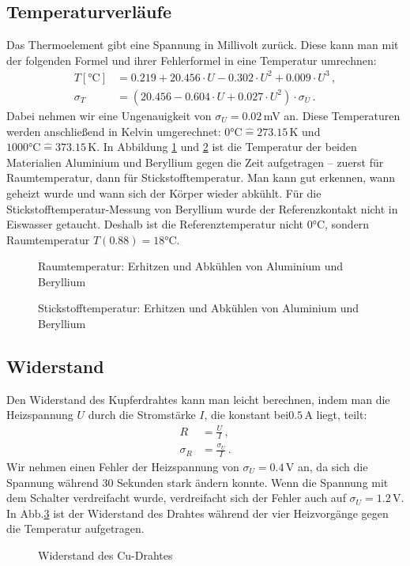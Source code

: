 \documentclass[12pt,a4paper,titlepage,headinclude,bibtotoc]{scrartcl}
\newcommand{\corresponds}{\ensuremath{\mathrel{\widehat{=}}}}
\begin{document}
\subsection{Temperaturverläufe}
Das Thermoelement gibt eine Spannung in Millivolt zurück.
Diese kann man mit der folgenden Formel und ihrer Fehlerformel in eine Temperatur umrechnen:
\begin{align}
	T[\si{\celsius}]&=0.219+20.456 \cdot U - 0.302\cdot U^2+0.009\cdot U^3 \,, \\
	\sigma_T&=(20.456 - 0.604\cdot U+0.027\cdot U^2)\cdot \sigma_U\,.
\end{align}
Dabei nehmen wir eine Ungenauigkeit von $\sigma_U=0.02\,$mV an.
Diese Temperaturen werden anschließend in Kelvin umgerechnet: $0\si\celsius\corresponds 273.15 \, \si\kelvin$ und $1000\si\celsius\corresponds 373.15 \, \si\kelvin$. 
In Abbildung \ref{fig:Raumtemp} und \ref{fig:Stickstofftemp} ist die Temperatur der beiden Materialien Aluminium und Beryllium gegen die Zeit aufgetragen -- zuerst für Raumtemperatur, dann für Stickstofftemperatur.
Man kann gut erkennen, wann geheizt wurde und wann sich der Körper wieder abkühlt.
Für die Stickstofftemperatur-Messung von Beryllium wurde der Referenzkontakt nicht in Eiswasser getaucht.
Deshalb ist die Referenztemperatur nicht $0\si\celsius$, sondern Raumtemperatur $T(0.88)=18\si\celsius$.
\begin{figure}[!htb]
	\centering
	
	\caption{Raumtemperatur: Erhitzen und Abkühlen von Aluminium und Beryllium}
	\label{fig:Raumtemp}
\end{figure}

\begin{figure}[!htb]
	\centering
	
	\caption{Stickstofftemperatur: Erhitzen und Abkühlen von Aluminium und Beryllium}
	\label{fig:Stickstofftemp}
\end{figure}

\subsection{Widerstand}
Den Widerstand des Kupferdrahtes kann man leicht berechnen, indem man die Heizspannung $U$ durch die Stromstärke $I$, die konstant bei$0.5\,$A liegt, teilt:
\begin{align}
	R&=\frac{U}{I}\,,\\
	\sigma_R&=\frac{\sigma_U}{I}\,.
\end{align}
Wir nehmen einen Fehler der Heizspannung von $\sigma_U=0.4\,$V an, da sich die Spannung während 30 Sekunden stark ändern konnte.
Wenn die Spannung mit dem Schalter verdreifacht wurde, verdreifacht sich der Fehler auch auf $\sigma_U=1.2\,$V.
In Abb.\ref{fig:Widerstand} ist der Widerstand des Drahtes während der vier Heizvorgänge gegen die Temperatur aufgetragen.
\begin{figure}[!htb]
	\centering
	
	\caption{Widerstand des Cu-Drahtes}
	\label{fig:Widerstand}
\end{figure}
\end{document}
